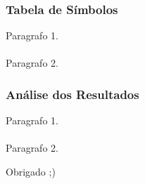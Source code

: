 
\begin{frame}
\frametitle{Tabela de Símbolos}
Paragrafo 1.
\\~\\
Paragrafo 2.
\end{frame}


\begin{frame}
\frametitle{Análise dos Resultados}
Paragrafo 1.
\\~\\
Paragrafo 2.
\end{frame}


\begin{frame}
\Huge{\centerline{Obrigado ;)}}
\end{frame}


